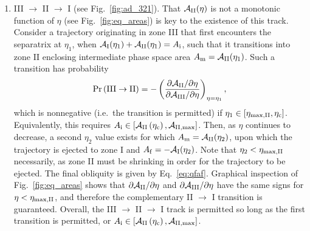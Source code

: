 \documentclass[twocolumn,twocolappendix]{aastex63}
\newcommand*{\pdil}[2]{\partial#1 / \partial#2}
\newcommand*{\p}[1]{\left(#1\right)}
\newcommand*{\s}[1]{\left[#1\right]}
\begin{document}
\begin{enumerate}
    \item III $\to$ II $\to$ I (see Fig.~\ref{fig:ad_321}). That
        $\mathcal{A}_{\rm II}(\eta)$ is not a monotonic function of $\eta$ (see
        Fig.~\ref{fig:eq_areas}) is key to the existence of this track. Consider
        a trajectory originating in zone III that first encounters the
        separatrix at $\eta_1$, when $\mathcal{A}_{\rm I}(\eta_1) +
        \mathcal{A}_{\rm II}(\eta_1) = A_{\rm i}$, such that it transitions into
        zone II enclosing intermediate phase space area $A_{\rm m} =
        \mathcal{A}_{\rm II}(\eta_1)$. Such a transition has probability
        \begin{equation}
            \Pr\p{\rm III \to II} = -\p{
                \frac{\pdil{\mathcal{A}_{\rm II}}{\eta}}{\pdil{\mathcal{A}_{\rm
                    III}}{\eta}}} _{\eta = \eta_1},
        \end{equation}
        which is nonnegative (i.e.\ the transition is permitted) if $\eta_1 \in
        [\eta_{\rm \max, II}, \eta_{\rm c}]$. Equivalently, this requires
        $A_{\rm i} \in \s{\mathcal{A}_{\rm II}\p{\eta_{\rm c}} ,
        \mathcal{A}_{\rm II, \max}}$. Then, as $\eta$ continues to decrease, a
        second $\eta_2$ value exists for which $A_{\rm m} = \mathcal{A}_{\rm
        II}(\eta_2)$, upon which the trajectory is ejected to zone I and $A_{\rm
        f} = -\mathcal{A}_{\rm I}(\eta_2)$. Note that $\eta_2 < \eta_{\rm \max,
        II}$ necessarily, as zone II must be shrinking in order for the
        trajectory to be ejected. The final obliquity is given by
        Eq.~\eqref{eq:qfaf}. Graphical inspection of Fig.~\ref{fig:eq_areas}
        shows that $\pdil{\mathcal{A}_{\rm II}}{\eta}$ and
        $\pdil{\mathcal{A}_{\rm III}}{\eta}$ have the same signs for $\eta <
        \eta_{\rm \max, II}$, and therefore the complementary II $\to$ I
        transition is guaranteed. Overall, the III $\to$ II $\to$ I track is
        permitted so long as the first transition is permitted, or $A_{\rm i}
        \in \s{\mathcal{A}_{\rm II}\p{\eta_{\rm c}} , \mathcal{A}_{\rm II,
        \max}}$.


\end{enumerate}
\end{document}
